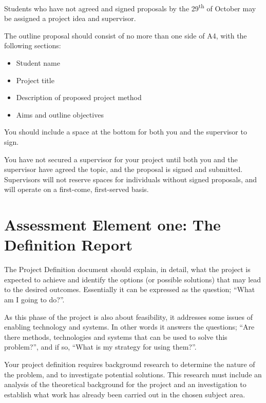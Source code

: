 \begin{tcolorbox}
    Students who have not agreed and signed proposals by the 29\textsuperscript{th} of October may be assigned a project idea and supervisor. 
\end{tcolorbox}

The outline proposal should consist of no more than one side of A4, with the following sections:

\begin{itemize}
    \item Student name
    \item Project title
    \item Description of proposed project method
    \item Aims and outline objectives
\end{itemize}

You should include a space at the bottom for both you and the supervisor to sign. 

\begin{tcolorbox}
    You have not secured a supervisor for your project until both you and the supervisor have agreed the topic, and the proposal is signed and submitted. Supervisors will not reserve spaces for individuals without signed proposals, and will operate on a first-come, first-served basis.
\end{tcolorbox}


\section{Assessment Element one: The Definition Report}

The Project Definition document should explain, in detail, what the project is expected to achieve and identify the options (or possible solutions) that may lead to the desired outcomes. Essentially it can be expressed as the  question; “What am I going to do?”.

As this phase of the project is also about feasibility, it addresses some issues of enabling technology and systems. In other words it answers the questions; “Are there methods, technologies and systems that can be used to solve this problem?”, and if so, “What is my strategy for using them?”.

Your project definition requires background research to determine the nature of the problem, and to investigate potential solutions. This research must include an analysis of the theoretical background for the project and an investigation to establish what work has already been carried out in the chosen subject area.


